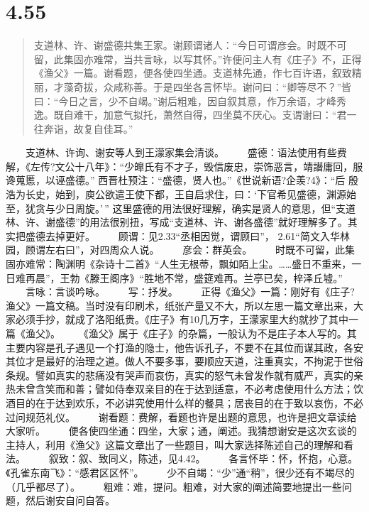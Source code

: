 \documentclass[]{book}
\begin{document}
\section{4.55}\label{section-232}

\begin{quote}
支道林、许、谢盛德共集王家。谢顾谓诸人：``今日可谓彦会。时既不可留，此集固亦难常，当共言咏，以写其怀。''许便问主人有《庄子》不，正得《渔父》一篇。谢看题，便各使四坐通。支道林先通，作七百许语，叙致精丽，才藻奇拔，众咸称善。于是四坐各言怀毕。谢问曰：``卿等尽不？''皆曰：``今日之言，少不自竭。''谢后粗难，因自叙其意，作万余语，才峰秀逸。既自难干，加意气拟托，萧然自得，四坐莫不厌心。支谓谢曰：``君一往奔诣，故复自佳耳。''
\end{quote}

　　支道林、许询、谢安等人到王濛家集会清谈。
　　盛德：语法使用有些费解，《左传?文公十八年》：``少皥氏有不才子，毁信废忠，崇饰恶言，靖譖庸回，服谗蒐慝，以诬盛德。''
西晋杜预注：``盛德，贤人也。''《世说新语?企羡?4》：``后
殷浩为长史，始到，庾公欲遣王使下都，王自启求住，曰：`下官希见盛德，渊源始至，犹贪与少日周旋。'\,''
这里盛德的用法很好理解，确实是贤人的意思，但``支道林、许、谢盛德''的用法很别扭，写成``支道林、许、谢各盛德''就好理解多了。其实把盛德去掉更好。
　　顾谓：见2.33``丞相因觉，谓顾曰''，
2.61``简文入华林园，顾谓左右曰''，对四周众人说。 　　彦会：群英会。
　　时既不可留，此集固亦难常：陶渊明《杂诗十二首》``人生无根蒂，飘如陌上尘。\ldots{}\ldots{}盛日不重来，一日难再晨''，王勃《滕王阁序》``胜地不常，盛筵难再。兰亭已矣，梓泽丘墟。''
　　言咏：言谈吟咏。 　　写：抒发。
　　正得《渔父》一篇：刚好有《庄子?渔父》一篇文稿。当时没有印刷术，纸张产量又不大，所以左思一篇文章出来，大家必须手抄，就成了洛阳纸贵。《庄子》有10几万字，王濛家里大约就抄了其中一篇《渔父》。
　　《渔父》属于《庄子》的杂篇，一般认为不是庄子本人写的。其主要内容是孔子遇见一个打渔的隐士，他告诉孔子，不要不在其位而谋其政，各安其位才是最好的治理之道。做人不要多事，要顺应天道，注重真实，不拘泥于世俗条规。譬如真实的悲痛没有哭声而哀伤，真实的怒气未曾发作就有威严，真实的亲热未曾含笑而和善；譬如侍奉双亲目的在于达到适意，不必考虑使用什么方法；饮酒目的在于达到欢乐，不必讲究使用什么样的餐具；居丧目的在于致以哀伤，不必过问规范礼仪。
　　谢看题：费解，看题也许是出题的意思，也许是把文章读给大家听。
　　便各使四坐通：四坐，大家；通，阐述。我猜想谢安是这次玄谈的主持人，利用《渔父》这篇文章出了一些题目，叫大家选择陈述自己的理解和看法。
　　叙致：叙、致同义，陈述，见4.42。
　　各言怀毕：怀，怀抱，心意。《孔雀东南飞》：``感君区区怀''。
　　少不自竭：``少''通``稍''，很少还有不竭尽的（几乎都尽了）。
　　粗难：难，提问。粗难，对大家的阐述简要地提出一些问题，然后谢安自问自答。
\end{document}
